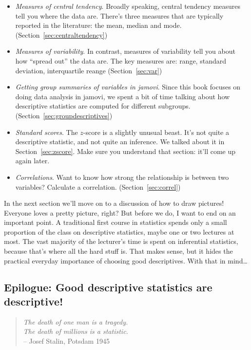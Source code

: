 \begin{itemize}
\item {\it Measures of central tendency}. Broadly speaking, central tendency measures tell you where the data are. There's three measures that are typically reported in the literature: the mean, median and mode. (Section~\ref{sec:centraltendency})
\item {\it Measures of variability}. In contrast, measures of variability tell you about how ``spread out'' the data are. The key measures are: range, standard deviation, interquartile reange (Section~\ref{sec:var})
\item {\it Getting group summaries of variables in jamovi}. Since this book focuses on doing data analysis in jamovi, we spent a bit of time talking about how descriptive statistics are computed for different subgroups. (Section~\ref{sec:groupdescriptives})
\item {\it Standard scores}. The $z$-score is a slightly unusual beast. It's not quite a descriptive statistic, and not quite an inference. We talked about it in Section~\ref{sec:zscore}. Make sure you understand that section: it'll come up again later. 
\item {\it Correlations}. Want to know how strong the relationship is between two variables? Calculate a correlation. (Section~\ref{sec:correl})
\end{itemize}
In the next section we'll move on to a discussion of how to draw pictures! Everyone loves a pretty picture, right? But before we do, I want to end on an important point. A traditional first course in statistics spends only a small proportion of the class on descriptive statistics, maybe one or two lectures at most. The vast majority of the lecturer's time is spent on inferential statistics, because that's where all the hard stuff is. That makes sense, but it hides the practical everyday importance of choosing good descriptives. With that in mind\ldots

\subsection{Epilogue: Good descriptive statistics are descriptive!}

\begin{quote}
{\it The death of one man is a tragedy.\\  The death of millions is a statistic.}\\
\hspace*{2cm} -- Josef Stalin, Potsdam 1945
\end{quote}

